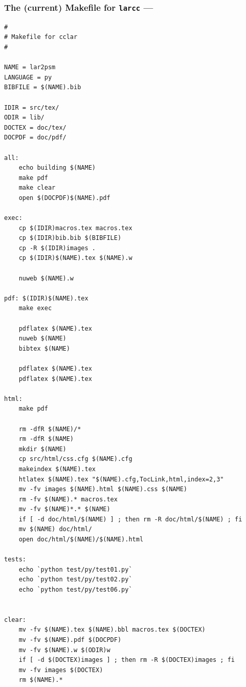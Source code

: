 \documentclass{beamer}
\begin{document}
\begin{frame}
  \frametitle{The (current) Makefile for \texttt{larcc} ---}
  \tiny
\begin{verbatim}
#
# Makefile for cclar
#

NAME = lar2psm
LANGUAGE = py
BIBFILE = $(NAME).bib

IDIR = src/tex/
ODIR = lib/
DOCTEX = doc/tex/
DOCPDF = doc/pdf/

all: 
    echo building $(NAME)
    make pdf
    make clear
    open $(DOCPDF)$(NAME).pdf

exec:
    cp $(IDIR)macros.tex macros.tex
    cp $(IDIR)bib.bib $(BIBFILE)
    cp -R $(IDIR)images . 
    cp $(IDIR)$(NAME).tex $(NAME).w
    
    nuweb $(NAME).w

pdf: $(IDIR)$(NAME).tex
    make exec
    
    pdflatex $(NAME).tex
    nuweb $(NAME)
    bibtex $(NAME)
    
    pdflatex $(NAME).tex
    pdflatex $(NAME).tex

html:
    make pdf
    
    rm -dfR $(NAME)/*
    rm -dfR $(NAME)
    mkdir $(NAME)
    cp src/html/css.cfg $(NAME).cfg
    makeindex $(NAME).tex
    htlatex $(NAME).tex "$(NAME).cfg,TocLink,html,index=2,3"
    mv -fv images $(NAME).html $(NAME).css $(NAME)
    rm -fv $(NAME).* macros.tex
    mv -fv $(NAME)*.* $(NAME)
    if [ -d doc/html/$(NAME) ] ; then rm -R doc/html/$(NAME) ; fi
    mv $(NAME) doc/html/
    open doc/html/$(NAME)/$(NAME).html

tests:
    echo `python test/py/test01.py`
    echo `python test/py/test02.py`
    echo `python test/py/test06.py`


clear:
    mv -fv $(NAME).tex $(NAME).bbl macros.tex $(DOCTEX)
    mv -fv $(NAME).pdf $(DOCPDF)
    mv -fv $(NAME).w $(ODIR)w
    if [ -d $(DOCTEX)images ] ; then rm -R $(DOCTEX)images ; fi
    mv -fv images $(DOCTEX)
    rm $(NAME).*
\end{verbatim}

\end{frame}
\end{document}
